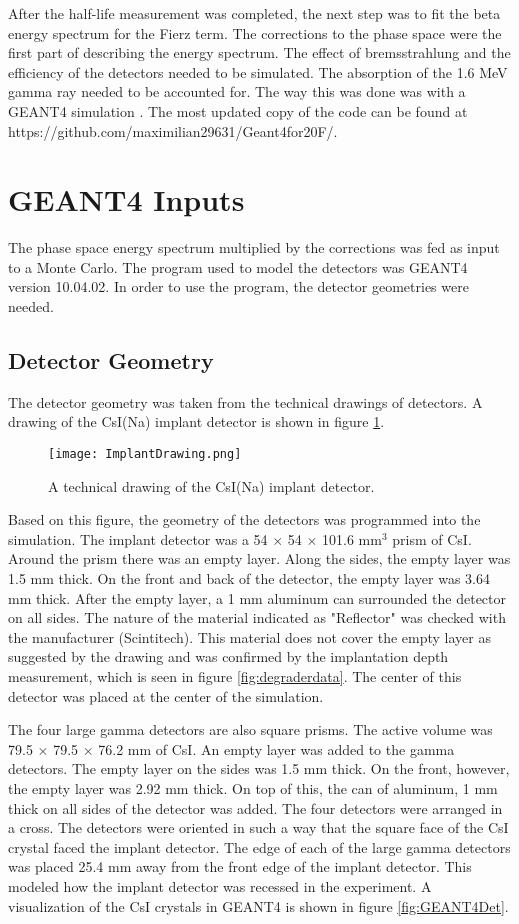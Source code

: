 \documentclass[../MaxHughesThesis.tex]{subfiles}
\begin{document}
After the half-life measurement was completed, the next step was to fit the beta energy spectrum for the Fierz term. 
The corrections to the phase space were the first part of describing the energy spectrum.  
The effect of bremsstrahlung and the efficiency of the detectors needed to be simulated.
The absorption of the 1.6 MeV gamma ray needed to be accounted for. 
The way this was done was with a GEANT4 simulation \cite{Ago03}.
The most updated copy of the code can be found at https://github.com/maximilian29631/Geant4for20F/.


\section{GEANT4 Inputs}
The phase space energy spectrum multiplied by the corrections was fed as input to a Monte Carlo.
The program used to model the detectors was GEANT4 version 10.04.02.
In order to use the program, the detector geometries were needed.

\subsection{Detector Geometry}
The detector geometry was taken from the technical drawings of detectors. 
A drawing of the CsI(Na) implant detector is shown in figure \ref{fig:ImplantTech}.
\begin{figure}[!htb]
	\centerline{\texttt{[image: ImplantDrawing.png]}}
	\caption{A technical drawing of the CsI(Na) implant detector.}
	\label{fig:ImplantTech}
\end{figure}
Based on this figure, the geometry of the detectors was programmed into the simulation.
The implant detector was a 54 $\times$ 54 $\times$ 101.6 mm$^{3}$ prism of CsI.
Around the prism there was an empty layer.
Along the sides, the empty layer was 1.5 mm thick.
On the front and back of the detector, the empty layer was 3.64 mm thick.
After the empty layer, a 1 mm aluminum can surrounded the detector on all sides.  
The nature of the material indicated as "Reflector" was checked with the manufacturer (Scintitech). 
This material does not cover the empty layer as suggested by the drawing and was confirmed by the implantation depth measurement, which is seen in figure \ref{fig:degraderdata}.
The center of this detector was placed at the center of the simulation.

The four large gamma detectors are also square prisms.
The active volume was 79.5 $\times$ 79.5 $\times$ 76.2 mm of CsI.
An empty layer was  added to the gamma detectors.
The empty layer on the sides was 1.5 mm thick.
On the front, however, the empty layer was 2.92 mm thick.
On top of this, the can of aluminum, 1 mm thick on all sides of the detector was added.
The four detectors were arranged in a cross.
The detectors were oriented in such a way that the square face of the CsI crystal faced the implant detector. 
The edge of each of the large gamma detectors was placed 25.4 mm away from the front edge of the implant detector.
This modeled how the implant detector was recessed in the experiment.
A visualization of the CsI crystals in GEANT4 is shown in figure \ref{fig:GEANT4Det}.
\end{document}
